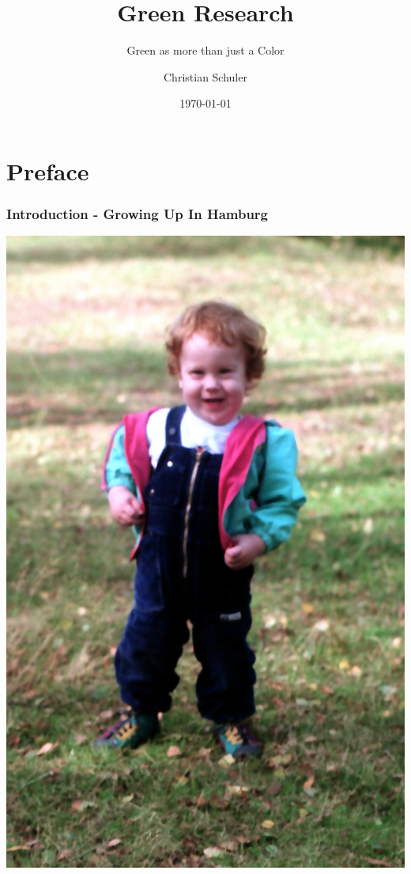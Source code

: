\documentclass[aspectratio=169]{beamer}
\title[Green Research]{Green Research}
\subtitle{Green as more than just a Color} %
\author{Christian Schuler}
\institute{Study Life \& Projects\\University of Hamburg and beyond}
\date{\today}
\begin{document}
\begin{frame}
	\titlepage
\end{frame}


\section{Preface}

\begin{frame}[fragile]
	\frametitle{Introduction - Growing Up In Hamburg}
    \centering
    \begin{minipage}{.14\textwidth}
        \centering
        \includegraphics[width=1.0\textwidth]{images/0104.jpg}

\end{minipage}
\end{frame}
\end{document}
